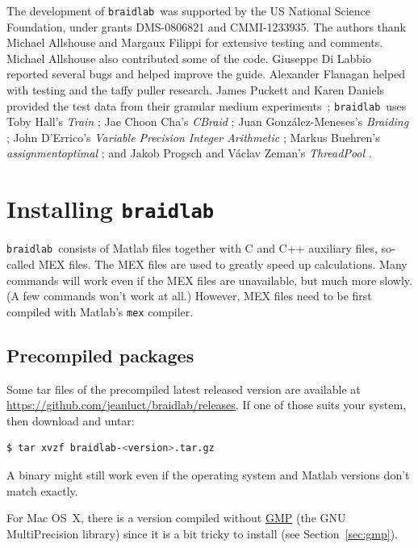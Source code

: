 \documentclass[12pt]{article}
\newcommand{\braidlab}{\texttt{braidlab}}%
\begin{document}
The development of \braidlab\ was supported by the US National Science
Foundation, under grants DMS-0806821 and CMMI-1233935. The authors thank
Michael Allshouse and Margaux Filippi for extensive testing and comments.
Michael Allshouse also contributed some of the code.  Giuseppe Di Labbio
reported several bugs and helped improve the guide.  Alexander Flanagan helped
with testing and the taffy puller research.  James Puckett and Karen Daniels
provided the test data from their granular medium
experiments~\citep{Puckett2012}; \braidlab\ uses Toby Hall's \emph{Train}
\citep{HallTrain}; Jae Choon Cha's \emph{CBraid} \citep{CBraid}; Juan
Gonz\'{a}lez-Meneses's \emph{Braiding} \citep{Braiding}; John D'Errico's
\emph{Variable Precision Integer Arithmetic} \citep{vpi}; Markus Buehren's
\emph{assignmentoptimal} \citep{assignmentoptimal}; and Jakob Progsch and
V\'{a}clav Zeman's \emph{ThreadPool} \citep{ThreadPool}.


\appendix

\section{Installing \braidlab}
\label{sec:install}
\index{installing \braidlab}

 \braidlab\ consists of Matlab files together with C
and C++ auxiliary files, so-called MEX files.  The MEX files are used to
greatly speed up calculations.  Many commands will work even if the MEX files
are unavailable, but much more slowly.  (A few commands won't work at all.)
However, MEX files need to be first compiled with Matlab's \lstinline{mex}
compiler.  

\subsection{Precompiled packages}
\label{sec:precompiled}

Some tar files of the precompiled latest released version are
available at \url{https://github.com/jeanluct/braidlab/releases}.  If one of
those suits your system, then download and untar:
\begin{lstlisting}[frame=single,framerule=0pt,escapechar=*,%
  language=bash,backgroundcolor=\color{white}]
$ tar xvzf braidlab-<version>.tar.gz
\end{lstlisting}
A binary might still work even if the operating system and Matlab versions
don't match exactly.

For Mac OS~X, there is a version compiled without
\href{https://gmplib.org/}{GMP} (the GNU MultiPrecision library) %
%
since it is a bit tricky to install (see Section~\ref{sec:gmp}).
\end{document}
